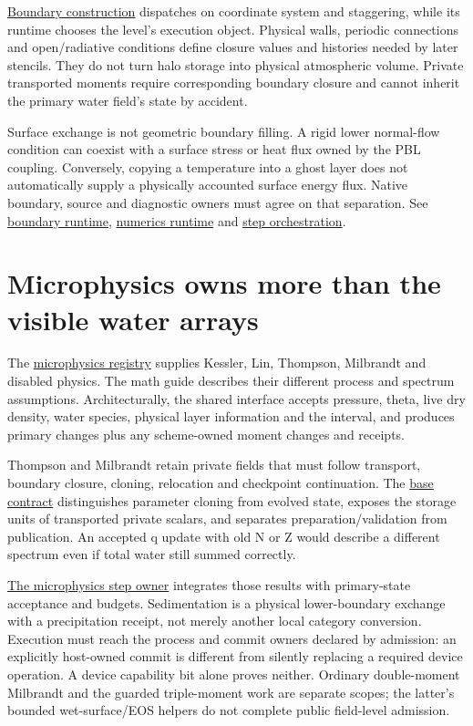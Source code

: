 \href{../src/boundary_conditions/factory.cpp}{Boundary construction} dispatches
on coordinate system and staggering, while its runtime chooses the level's
execution object. Physical walls, periodic connections and open/radiative
conditions define closure values and histories needed by later stencils.
They do not turn halo storage into physical atmospheric volume. Private
transported moments require corresponding boundary closure and cannot inherit
the primary water field's state by accident.

Surface exchange is not geometric boundary filling. A rigid lower normal-flow
condition can coexist with a surface stress or heat flux owned by the PBL
coupling. Conversely, copying a temperature into a ghost layer does not
automatically supply a physically accounted surface energy flux. Native
boundary, source and diagnostic owners must agree on that separation.
See \href{../src/boundary_conditions/runtime.cpp}{boundary runtime},
\href{../src/numerics/runtime.cpp}{numerics runtime} and
\href{../src/core/orchestration/dynamics/dynamics.cpp}{step orchestration}.

\section{Microphysics owns more than the visible water arrays}

The \href{../src/microphysics/factory.cpp}{microphysics registry} supplies
Kessler, Lin, Thompson, Milbrandt and disabled physics. The math guide describes
their different process and spectrum assumptions. Architecturally, the shared
interface accepts pressure, theta, live dry density, water species, physical
layer information and the interval, and produces primary changes plus any
scheme-owned moment changes and receipts.

Thompson and Milbrandt retain private fields that must follow transport,
boundary closure, cloning, relocation and checkpoint continuation. The
\href{../include/microphysics/microphysics_base.hpp}{base contract} distinguishes
parameter cloning from evolved state, exposes the storage units of transported
private scalars, and separates preparation/validation from publication.
An accepted q update with old N or Z would describe a different spectrum even
if total water still summed correctly.

\href{../src/core/orchestration/physics/microphysics_step.cpp}{The microphysics
step owner} integrates those results with primary-state acceptance and budgets.
Sedimentation is a physical lower-boundary exchange with a precipitation
receipt, not merely another local category conversion. Execution must reach
the process and commit owners declared by admission: an explicitly host-owned
commit is different from silently replacing a required device operation.
A device capability bit alone proves neither. Ordinary double-moment Milbrandt and the guarded
triple-moment work are separate scopes; the latter's bounded wet-surface/EOS
helpers do not complete public field-level admission.

